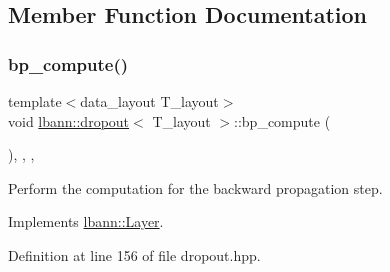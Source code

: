 \subsection{Member Function Documentation}
\mbox{\label{classlbann_1_1dropout_a053e3f392a6a90b3bcc07f62f3818bce}} 
\subsubsection{\texorpdfstring{bp\+\_\+compute()}{bp\_compute()}}
{\footnotesize\ttfamily template$<$data\+\_\+layout T\+\_\+layout$>$ \\
void \hyperlink{classlbann_1_1dropout}{lbann\+::dropout}$<$ T\+\_\+layout $>$\+::bp\+\_\+compute (\begin{DoxyParamCaption}{ }\end{DoxyParamCaption})\hspace{0.3cm}{\ttfamily [inline]}, {\ttfamily [override]}, {\ttfamily [protected]}, {\ttfamily [virtual]}}

Perform the computation for the backward propagation step. 

Implements \hyperlink{classlbann_1_1Layer_a7442e01f9ee1294df2de811efcf5171e}{lbann\+::\+Layer}.



Definition at line 156 of file dropout.\+hpp.


